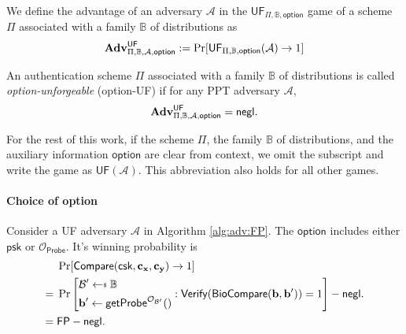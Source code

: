 
We define the advantage of an adversary $\mathcal{A}$ in the $\textsf{UF}_{\Pi, \mathbb{B}, \textsf{option}}$ game of a scheme $\Pi$ associated with a family $\mathbb{B}$ of distributions as
\[
	\mathbf{Adv}^{\textsf{UF}}_{\Pi, \mathbb{B}, \mathcal{A}, \textsf{option}} := \Pr[\textsf{UF}_{\Pi, \mathbb{B}, \textsf{option}}(\mathcal{A}) \to 1]
\]

An authentication scheme $\Pi$ associated with a family $\mathbb{B}$ of distributions is called \emph{\textsf{option}-unforgeable} (\textsf{option}-UF) if for any PPT adversary $\mathcal{A}$,
\[
	\mathbf{Adv}^{\textsf{UF}}_{\Pi, \mathbb{B}, \mathcal{A}, \textsf{option}} = \mathsf{negl}.
\]

For the rest of this work, if the scheme $\Pi$, the family $\mathbb{B}$ of distributions, and the auxiliary information $\textsf{option}$ are clear from context, we omit the subscript and write the game as $\textsf{UF}(\mathcal{A})$. This abbreviation also holds for all other games.

\paragraph{Choice of \textsf{option}}
\noindent Consider a \textsf{UF} adversary $\mathcal{A}$ in Algorithm \ref{alg:adv:FP}. The $\textsf{option}$ includes either $\textsf{psk}$ or $\mathcal{O}_{\textsf{Probe}}$. It's winning probability is
\begin{align*}
	& \Pr [ \textsf{Compare}(\textsf{csk}, \mathbf{c_x}, \mathbf{c_y}) \to 1 ] \\
	=\; & \Pr \left [
		\begin{aligned}
			& \mathcal{B}^\prime \getsdollar \mathbb{B} \\
			& \mathbf{b}^\prime \gets \textsf{getProbe}^{\mathcal{O}_{\mathcal{B}^\prime} }()
		\end{aligned}
		: \textsf{Verify}(\textsf{BioCompare}(\mathbf{b}, \mathbf{b}^\prime)) = 1 \right ] - \negl. \\
	=\; & \textsf{FP} - \negl.
\end{align*}

